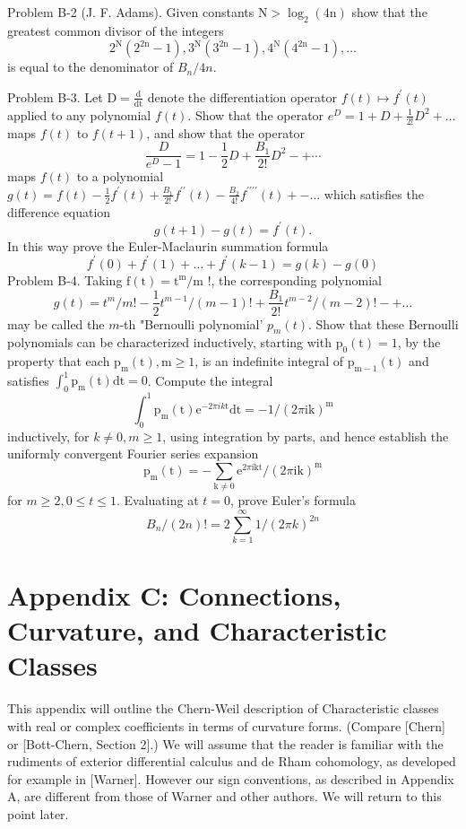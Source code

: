 \documentclass[10pt]{article}
\begin{document}
Problem B-2 (J. F. Adams). Given constants $\mathrm{N}>\log _{2}(4 \mathrm{n})$ show that the greatest common divisor of the integers
$$
2^{\mathrm{N}}\left(2^{2 \mathrm{n}}-1\right), 3^{\mathrm{N}}\left(3^{2 \mathrm{n}}-1\right), 4^{\mathrm{N}}\left(4^{2 \mathrm{n}}-1\right), \ldots
$$
is equal to the denominator of $B_{n} / 4 n$.

Problem B-3. Let $\mathrm{D}=\frac{\mathrm{d}}{\mathrm{dt}}$ denote the differentiation operator $f(t) \mapsto f^{\prime}(t)$ applied to any polynomial $f(t)$. Show that the operator $e^{D}=1+D+\frac{1}{2 !} D^{2}+\ldots$ maps $f(t)$ to $f(t+1)$, and show that the operator
$$
\frac{D}{e^{D}-1}=1-\frac{1}{2} D+\frac{B_{1}}{2 !} D^{2}-+\cdots
$$
maps $f(t)$ to a polynomial $g(t)=f(t)-\frac{1}{2} f^{\prime}(t)+\frac{B_{1}}{2 !} f^{\prime \prime}(t)-\frac{B_{2}}{4 !} f^{\prime \prime \prime \prime}(t)+-\ldots$ which satisfies the difference equation
$$
g(t+1)-g(t)=f^{\prime}(t) .
$$
In this way prove the Euler-Maclaurin summation formula
$$
f^{\prime}(0)+f^{\prime}(1)+\ldots+f^{\prime}(k-1)=g(k)-g(0)
$$
Problem B-4. Taking $\mathrm{f}(\mathrm{t})=\mathrm{t}^{\mathrm{m}} / \mathrm{m}$ !, the corresponding polynomial
$$
g(t)=t^{m} / m !-\frac{1}{2} t^{m-1} /(m-1) !+\frac{B_{1}}{2 !} t^{m-2} /(m-2) !-+\ldots
$$
may be called the $m$-th "Bernoulli polynomial' $p_{m}(t)$. Show that these Bernoulli polynomials can be characterized inductively, starting with $\mathrm{p}_{0}(\mathrm{t})=1$, by the property that each $\mathrm{p}_{\mathrm{m}}(\mathrm{t}), \mathrm{m} \geq 1$, is an indefinite integral of $\mathrm{p}_{\mathrm{m}-1}(\mathrm{t})$ and satisfies $\int_{0}^{1} \mathrm{p}_{\mathrm{m}}(\mathrm{t}) \mathrm{dt}=0$. Compute the integral
$$
\int_{0}^{1} \mathrm{p}_{\mathrm{m}}(\mathrm{t}) \mathrm{e}^{-2 \pi i k \mathrm{t}} \mathrm{dt}=-1 /(2 \pi \mathrm{ik})^{\mathrm{m}}
$$
inductively, for $k \neq 0, m \geq 1$, using integration by parts, and hence establish the uniformly convergent Fourier series expansion
$$
\mathrm{p}_{\mathrm{m}}(\mathrm{t})=-\sum_{\mathrm{k} \neq 0} \mathrm{e}^{2 \pi \mathrm{ikt}} /(2 \pi \mathrm{ik})^{\mathrm{m}}
$$
for $m \geq 2,0 \leq t \leq 1$. Evaluating at $t=0$, prove Euler's formula
$$
B_{n} /(2 n) !=2 \sum_{k=1}^{\infty} 1 /(2 \pi k)^{2 n}
$$

\section{Appendix C: Connections, Curvature, and Characteristic Classes}
This appendix will outline the Chern-Weil description of Characteristic classes with real or complex coefficients in terms of curvature forms. (Compare [Chern] or [Bott-Chern, Section 2].) We will assume that the reader is familiar with the rudiments of exterior differential calculus and de Rham cohomology, as developed for example in [Warner]. However our sign conventions, as described in Appendix A, are different from those of Warner and other authors. We will return to this point later.
\end{document}
